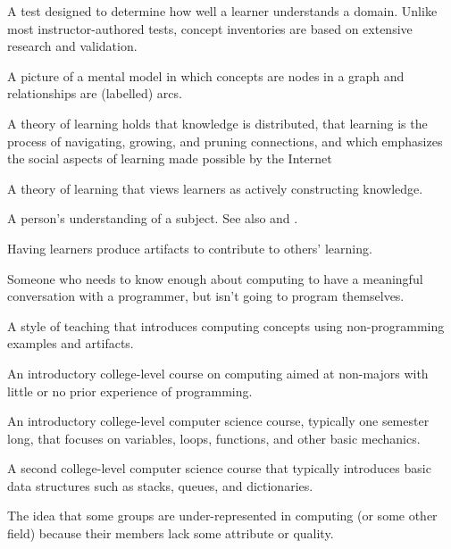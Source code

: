 \begin{description}
 A test designed to determine
how well a learner understands a domain.  Unlike most instructor-authored tests,
concept inventories are based on extensive research and validation.

 A picture of a mental model in which
concepts are nodes in a graph and relationships are (labelled) arcs.

 A theory of learning holds that knowledge
is distributed, that learning is the process of navigating, growing, and pruning
connections, and which emphasizes the social aspects of learning made possible
by the Internet

 A theory of learning that views
learners as actively constructing knowledge.

 A person's understanding of a
subject. See also
and .

 Having learners
produce artifacts to contribute to others' learning.

 Someone who
needs to know enough about computing to have a meaningful conversation with a
programmer, but isn't going to program themselves.

 A style of teaching that introduces
computing concepts using non-programming examples and artifacts.

 An introductory college-level course on computing aimed at
non-majors with little or no prior experience of programming.

 An introductory college-level computer science course,
typically one semester long, that focuses on variables, loops, functions, and
other basic mechanics.

 A second college-level computer science course that
typically introduces basic data structures such as stacks, queues, and
dictionaries.

 The idea that some groups are
under-represented in computing (or some other field) because their members lack
some attribute or quality.


\end{description}
